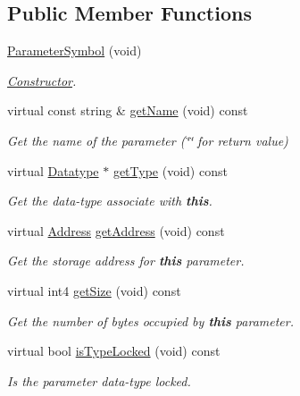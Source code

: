 \subsection*{Public Member Functions}
\begin{DoxyCompactItemize}
\item 
\mbox{\hyperlink{class_parameter_symbol_a918d24c31eef2a92f8af3d5047d97659}{Parameter\+Symbol}} (void)
\begin{DoxyCompactList}\small\item\em \mbox{\hyperlink{class_constructor}{Constructor}}. \end{DoxyCompactList}\item 
virtual const string \& \mbox{\hyperlink{class_parameter_symbol_ad0e7cd03c77c5c514b980a0410547c7c}{get\+Name}} (void) const
\begin{DoxyCompactList}\small\item\em Get the name of the parameter (\char`\"{}\char`\"{} for return value) \end{DoxyCompactList}\item 
virtual \mbox{\hyperlink{class_datatype}{Datatype}} $\ast$ \mbox{\hyperlink{class_parameter_symbol_aec9aa765fcdb4e21f4fd223573e802b3}{get\+Type}} (void) const
\begin{DoxyCompactList}\small\item\em Get the data-\/type associate with {\bfseries{this}}. \end{DoxyCompactList}\item 
virtual \mbox{\hyperlink{class_address}{Address}} \mbox{\hyperlink{class_parameter_symbol_a758e26ad63c7c212d9a70c5a82bbebf4}{get\+Address}} (void) const
\begin{DoxyCompactList}\small\item\em Get the storage address for {\bfseries{this}} parameter. \end{DoxyCompactList}\item 
virtual int4 \mbox{\hyperlink{class_parameter_symbol_a3b5d9b9aabab788511f43446745048c9}{get\+Size}} (void) const
\begin{DoxyCompactList}\small\item\em Get the number of bytes occupied by {\bfseries{this}} parameter. \end{DoxyCompactList}\item 
virtual bool \mbox{\hyperlink{class_parameter_symbol_a91e7013d6ae6692ca8bdd95834625a2d}{is\+Type\+Locked}} (void) const
\begin{DoxyCompactList}\small\item\em Is the parameter data-\/type locked. \end{DoxyCompactList}\item 

\end{DoxyCompactItemize}
